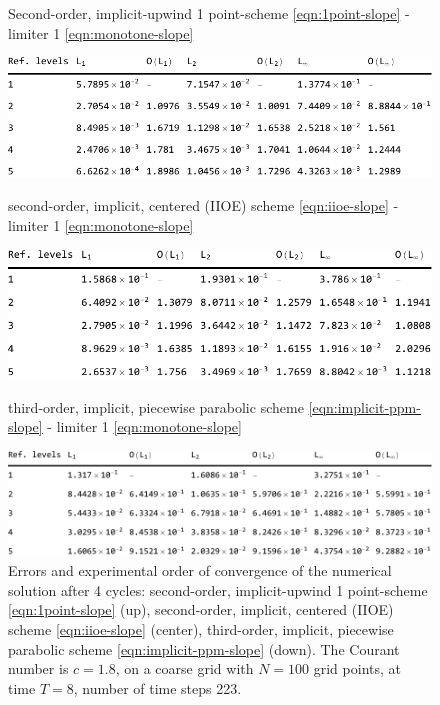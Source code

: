 \documentclass[../thesis.tex]{subfiles}
\begin{document}
\begin{figure}[H]
	\centering
    \caption*{Second-order, implicit-upwind 1 point-scheme \eqref{eqn:1point-slope} - limiter 1 \eqref{eqn:monotone-slope}}
	\includegraphics[width=\textwidth]{../tab/tab-1point-c1p8-T8-limit1-smooth.pdf}
    \caption*{second-order, implicit, centered (IIOE) scheme \eqref{eqn:iioe-slope} - limiter 1 \eqref{eqn:monotone-slope}}
	\includegraphics[width=\textwidth]{../tab/tab-iioe-c1p8-T8-limit1-smooth.pdf}
    \caption*{third-order, implicit, piecewise parabolic scheme \eqref{eqn:implicit-ppm-slope} - limiter 1 \eqref{eqn:monotone-slope}}
	\includegraphics[width=\textwidth]{../tab/tab-implicit-ppm-c1p8-T8-limit1-smooth.pdf}
	\caption{Errors and experimental order of convergence of the numerical solution after 4 cycles: second-order, implicit-upwind 1 point-scheme \eqref{eqn:1point-slope} (up), second-order, implicit, centered (IIOE) scheme \eqref{eqn:iioe-slope} (center), third-order, implicit, piecewise parabolic scheme \eqref{eqn:implicit-ppm-slope} (down). The Courant number is \(c = 1.8\), on a coarse grid with \(N = 100\) grid points, at time \(T = 8\), number of time steps 223.}
	\label{tab:c1p8-T8-limit1-smooth}
\end{figure}
\end{document}
